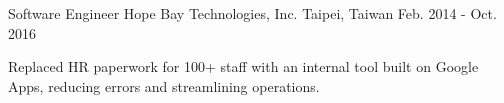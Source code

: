 \begin{cventries}
  \cventry
  {Software Engineer} %
  {Hope Bay Technologies, Inc.} %
  {Taipei, Taiwan} %
  {Feb. 2014 - Oct. 2016} %
  {
    \begin{cvitems} %
      \item {Replaced HR paperwork for 100+ staff with an internal tool built on Google Apps, reducing errors and streamlining operations.}
    \end{cvitems}
  }

\end{cventries}
